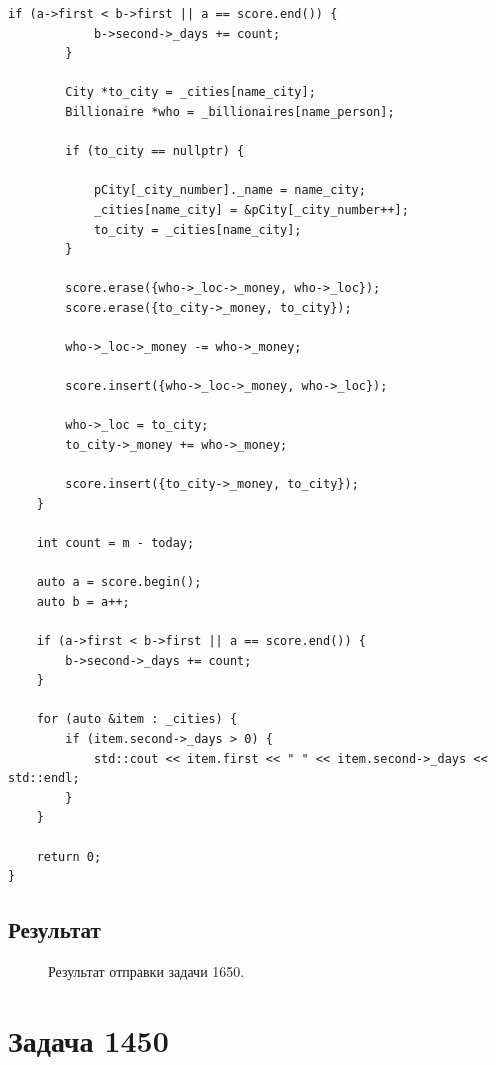\documentclass[a5paper, 10pt]{article}
\theoremstyle{definition}
\theoremstyle{plain}
\theoremstyle{remark}
\begin{document}
\begin{center}
\begin{lstlisting}[label=some-code,caption={Исходный код для 1650}]
        if (a->first < b->first || a == score.end()) {
            b->second->_days += count;
        }

        City *to_city = _cities[name_city];
        Billionaire *who = _billionaires[name_person];

        if (to_city == nullptr) {

            pCity[_city_number]._name = name_city;
            _cities[name_city] = &pCity[_city_number++];
            to_city = _cities[name_city];
        }

        score.erase({who->_loc->_money, who->_loc});
        score.erase({to_city->_money, to_city});

        who->_loc->_money -= who->_money;

        score.insert({who->_loc->_money, who->_loc});

        who->_loc = to_city;
        to_city->_money += who->_money;

        score.insert({to_city->_money, to_city});
    }

    int count = m - today;

    auto a = score.begin();
    auto b = a++;

    if (a->first < b->first || a == score.end()) {
        b->second->_days += count;
    }

    for (auto &item : _cities) {
        if (item.second->_days > 0) {
            std::cout << item.first << " " << item.second->_days << std::endl;
        }
    }

    return 0;
}
\end{lstlisting}
\end{center}

\newpage
\subsection{Результат}
\begin{figure}[h!]
\caption{Результат отправки задачи 1650.}
\end{figure}







\newpage
\section{Задача 1450}
\end{document}
